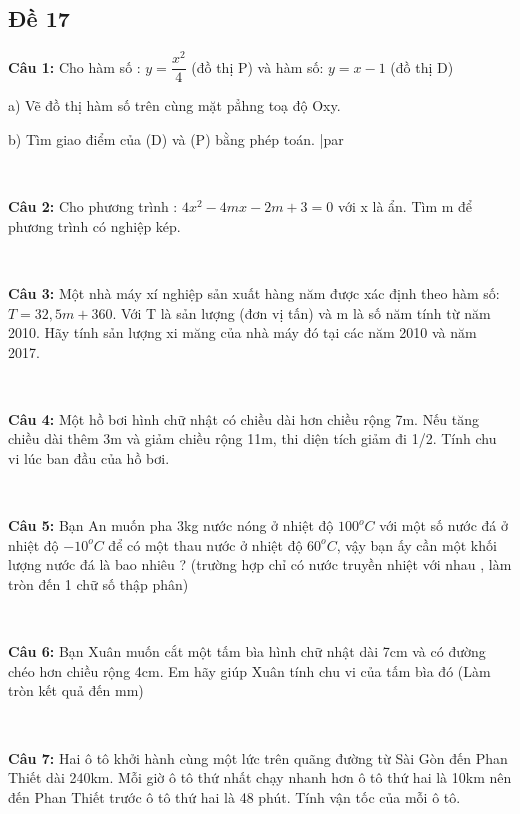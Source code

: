 \documentclass[12pt]{article}
\begin{document}
\break

\subsection{Đề 17}

\textbf{Câu 1:} Cho hàm số : $y = \dfrac{x^2}{4}$ (đồ thị P) và hàm số: $y = x - 1$ (đồ thị D) \par
a) Vẽ đồ thị hàm số trên cùng mặt pẳhng toạ độ Oxy. \par
b) Tìm giao điểm của  (D) và (P) bằng phép toán. |par

\    

\textbf{Câu 2:} Cho phương trình : $4x^2 - 4mx - 2m + 3 = 0$ với x là ẩn. Tìm m để phương trình có nghiệp kép. \par

\   

\textbf{Câu 3:} Một nhà máy xí nghiệp sản xuất hàng năm được xác định theo hàm số: $T = 32,5m + 360$. Với T là sản lượng (đơn vị tấn) và m là số năm tính từ năm 2010. Hãy tính sản lượng xi măng của nhà máy đó tại các năm 2010 và năm 2017. \par

\   

\textbf{Câu 4:} Một hồ bơi hình chữ nhật có chiều dài hơn chiều rộng 7m. Nếu tăng chiều dài thêm 3m và giảm chiều rộng 11m, thi diện tích giảm đi 1/2. Tính chu vi lúc ban đầu của hồ bơi.\par

\   

\textbf{Câu 5:} Bạn An muốn pha 3kg nước nóng ở nhiệt độ $100^oC$ với một số nước đá ở nhiệt độ $-10^oC$ để có một thau nước ở nhiệt độ $60^oC$, vậy bạn ấy cần một khối lượng nước đá là bao nhiêu ? (trường hợp chỉ có nước truyền nhiệt với nhau , làm tròn đến 1 chữ số thập phân) \par

\    

\textbf{Câu 6:} Bạn Xuân muốn cắt một tấm bìa hình chữ nhật dài 7cm và có đường chéo hơn chiều rộng 4cm. Em hãy giúp Xuân tính chu vi của tấm bìa đó (Làm tròn kết quả đến mm) \par

\   

\textbf{Câu 7:} Hai ô tô khởi hành cùng một lức trên quãng đường từ Sài Gòn đến Phan Thiết dài 240km. Mỗi giờ ô tô thứ nhất chạy nhanh hơn ô tô thứ hai là 10km nên đến Phan Thiết trước ô tô thứ hai là 48 phút. Tính vận tốc của mỗi ô tô. \par
\end{document}

